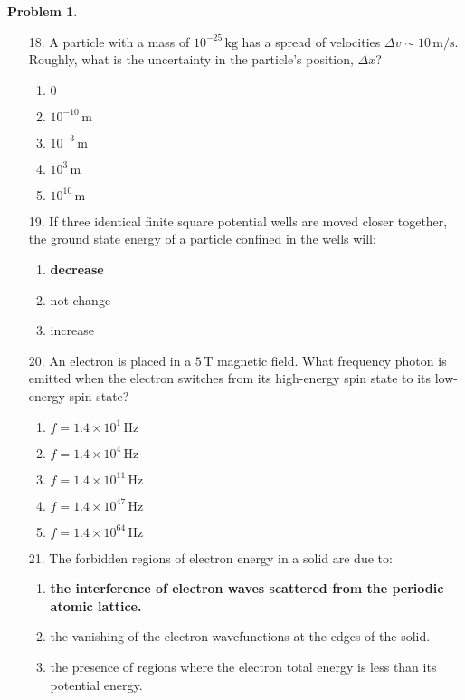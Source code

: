 \documentclass[12pt]{article}
\theoremstyle{definition} %
\newtheorem{problem}{Problem}
\theoremstyle{plain} %
\begin{document}
\begin{problem}
    
    \begin{enumerate}
        \item[18.] A particle with a mass of \(10^{-25} \, \text{kg}\) has a spread of velocities \(\Delta v \sim 10 \, \text{m/s}\). Roughly, what is the uncertainty in the particle's position, \(\Delta x\)?
        \begin{enumerate}
            \item \(0\)
            \item \textbf{\(10^{-10} \, \text{m}\)}
            \item \(10^{-3} \, \text{m}\)
            \item \(10^3 \, \text{m}\)
            \item \(10^{10} \, \text{m}\)
        \end{enumerate}
        \item[19.] If three identical finite square potential wells are moved closer together, the ground state energy of a particle confined in the wells will:
        \begin{enumerate}
            \item \textbf{decrease}
            \item not change
            \item increase
        \end{enumerate}
    
        \item[20.] An electron is placed in a \(5 \, \text{T}\) magnetic field. What frequency photon is emitted when the electron switches from its high-energy spin state to its low-energy spin state?
        \begin{enumerate}
            \item \(f = 1.4 \times 10^1 \, \text{Hz}\)
            \item \(f = 1.4 \times 10^4 \, \text{Hz}\)
            \item \textbf{\(f = 1.4 \times 10^{11} \, \text{Hz}\)}
            \item \(f = 1.4 \times 10^{47} \, \text{Hz}\)
            \item \(f = 1.4 \times 10^{64} \, \text{Hz}\)
        \end{enumerate}
    
        \item[21.] The forbidden regions of electron energy in a solid are due to:
        \begin{enumerate}
            \item \textbf{the interference of electron waves scattered from the periodic atomic lattice.}
            \item the vanishing of the electron wavefunctions at the edges of the solid.
            \item the presence of regions where the electron total energy is less than its potential energy.
        \end{enumerate}
    

\end{enumerate}
\end{problem}
\end{document}
